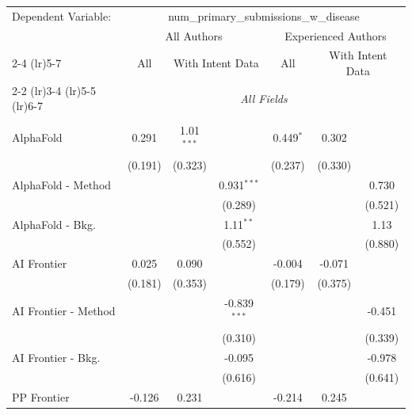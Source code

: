 \begingroup
\centering
\begin{tabular}{lcccccc}
   \tabularnewline \midrule \midrule
   Dependent Variable: & \multicolumn{6}{c}{num\_primary\_submissions\_w\_disease}\\
 & \multicolumn{3}{c}{All Authors} & \multicolumn{3}{c}{Experienced Authors} \\
\cmidrule(lr){2-4} \cmidrule(lr){5-7}
 & \multicolumn{1}{c}{All} & \multicolumn{2}{c}{With Intent Data} & \multicolumn{1}{c}{All} & \multicolumn{2}{c}{With Intent Data} \\
\cmidrule(lr){2-2} \cmidrule(lr){3-4} \cmidrule(lr){5-5} \cmidrule(lr){6-7}
 & \multicolumn{6}{c}{\textit{All Fields}} \\ \\
   AlphaFold            & 0.291   & 1.01$^{***}$ &                & 0.449$^{*}$ & 0.302   &   \\   
                        & (0.191) & (0.323)      &                & (0.237)     & (0.330) &   \\   
   AlphaFold - Method   &         &              & 0.931$^{***}$  &             &         & 0.730\\   
                        &         &              & (0.289)        &             &         & (0.521)\\   
   AlphaFold - Bkg.     &         &              & 1.11$^{**}$    &             &         & 1.13\\   
                        &         &              & (0.552)        &             &         & (0.880)\\   
   AI Frontier          & 0.025   & 0.090        &                & -0.004      & -0.071  &   \\   
                        & (0.181) & (0.353)      &                & (0.179)     & (0.375) &   \\   
   AI Frontier - Method &         &              & -0.839$^{***}$ &             &         & -0.451\\   
                        &         &              & (0.310)        &             &         & (0.339)\\   
   AI Frontier - Bkg.   &         &              & -0.095         &             &         & -0.978\\   
                        &         &              & (0.616)        &             &         & (0.641)\\   
   PP Frontier          & -0.126  & 0.231        &                & -0.214      & 0.245   &   \\   

\end{tabular}
